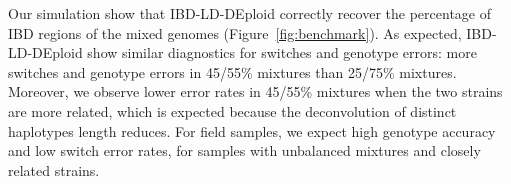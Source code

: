 \documentclass{article}
\begin{document}
Our simulation show that IBD-LD-DEploid correctly recover the percentage of IBD regions of the mixed genomes (Figure~\ref{fig:benchmark}). As expected, IBD-LD-DEploid show similar diagnostics for switches and genotype errors: more switches and genotype errors in 45/55\% mixtures than 25/75\% mixtures. Moreover, we observe lower error rates in 45/55\% mixtures when the two strains are more related, which is expected because the deconvolution of distinct haplotypes length reduces. For field samples, we expect high genotype accuracy and low switch error rates, for samples with unbalanced mixtures and closely related strains.


\begin{figure}[htp]
  \centering{}
  \\
\end{figure}
\end{document}
